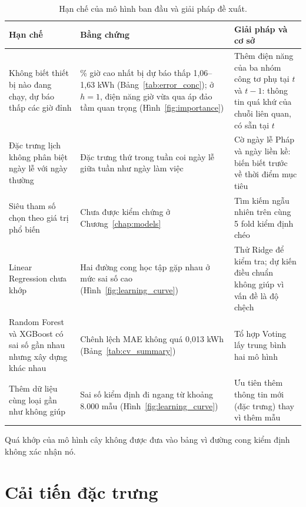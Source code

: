 \begin{table}[htbp]
    \centering
    \caption{Hạn chế của mô hình ban đầu và giải pháp đề xuất.}
    \label{tab:limits}
    \small
    \begin{tabularx}{\textwidth}{|>{\raggedright\arraybackslash}p{3.6cm}|>{\raggedright\arraybackslash}X|>{\raggedright\arraybackslash}p{4.2cm}|}
        \hline
        \textbf{Hạn chế} & \textbf{Bằng chứng} & \textbf{Giải pháp và cơ sở} \\ \hline
        Không biết thiết bị nào đang chạy, dự báo thấp các giờ đỉnh & 5\% giờ cao nhất bị dự báo thấp 1,06--1,63 kWh (Bảng~\ref{tab:error_conc}); ở $h = 1$, điện năng giờ vừa qua áp đảo tầm quan trọng (Hình~\ref{fig:importance}) & Thêm điện năng của ba nhóm công tơ phụ tại $t$ và $t-1$: thông tin quá khứ của chuỗi liên quan, có sẵn tại $t$ \\ \hline
        Đặc trưng lịch không phân biệt ngày lễ với ngày thường & Đặc trưng thứ trong tuần coi ngày lễ giữa tuần như ngày làm việc & Cờ ngày lễ Pháp và ngày liền kề: biến biết trước về thời điểm mục tiêu \\ \hline
        Siêu tham số chọn theo giá trị phổ biến & Chưa được kiểm chứng ở Chương~\ref{chap:models} & Tìm kiếm ngẫu nhiên trên cùng 5 fold kiểm định chéo \\ \hline
        Linear Regression chưa khớp & Hai đường cong học tập gặp nhau ở mức sai số cao (Hình~\ref{fig:learning_curve}) & Thử Ridge để kiểm tra; dự kiến điều chuẩn không giúp vì vấn đề là độ chệch \\ \hline
        Random Forest và XGBoost có sai số gần nhau nhưng xây dựng khác nhau & Chênh lệch MAE không quá 0,013 kWh (Bảng~\ref{tab:cv_summary}) & Tổ hợp Voting lấy trung bình hai mô hình \\ \hline
        Thêm dữ liệu cùng loại gần như không giúp & Sai số kiểm định đi ngang từ khoảng 8.000 mẫu (Hình~\ref{fig:learning_curve}) & Ưu tiên thêm thông tin mới (đặc trưng) thay vì thêm mẫu \\ \hline
    \end{tabularx}
\end{table}

Quá khớp của mô hình cây không được đưa vào bảng vì đường cong kiểm định không xác nhận nó.

\section{Cải tiến đặc trưng}
\label{sec:feat_improve}


